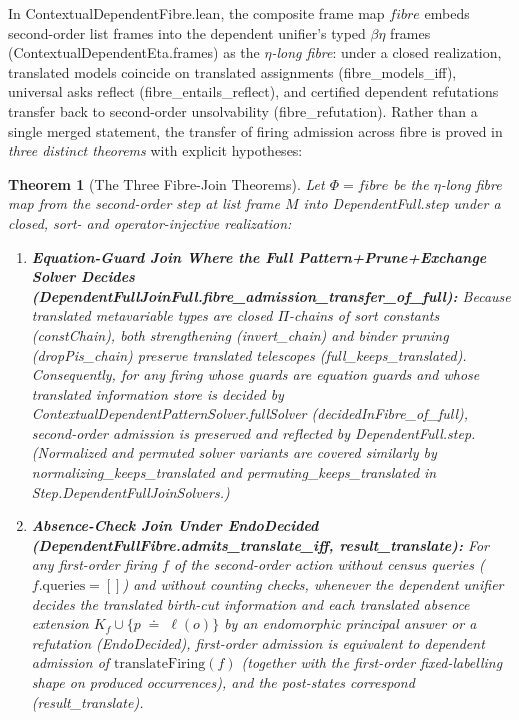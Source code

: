 \documentclass[11pt,a4paper]{article}
\newtheorem{theorem}{Theorem}[section]
\theoremstyle{definition}
\DeclareRobustCommand{\lean}[1]{%
  \ifmmode\text{\normalfont\ttfamily\footnotesize\detokenize{#1}}%
  \else{\normalfont\footnotesize\leanurl{#1}}\fi}
\def\lean#1{#1}%
\newcommand{\doteqStore}{\;\doteq\;}
\begin{document}
In \lean{ContextualDependentFibre.lean}, the composite frame map $\lean{fibre}$ embeds second-order list frames into the dependent unifier's typed $\beta\eta$ frames (\lean{ContextualDependentEta.frames}) as the \emph{$\eta$-long fibre}: under a closed realization, translated models coincide on translated assignments (\lean{fibre_models_iff}), universal asks reflect (\lean{fibre_entails_reflect}), and certified dependent refutations transfer back to second-order unsolvability (\lean{fibre_refutation}). Rather than a single merged statement, the transfer of firing admission across \lean{fibre} is proved in \emph{three distinct theorems} with explicit hypotheses:

\begin{theorem}[The Three Fibre-Join Theorems]
\label{thm:three-joins}
Let $\Phi = \lean{fibre}$ be the $\eta$-long fibre map from the second-order step at list frame $M$ into \lean{DependentFull.step} under a closed, sort- and operator-injective realization:
\begin{enumerate}[leftmargin=2em, nosep]
  \item \textbf{Equation-Guard Join Where the Full Pattern+Prune+Exchange Solver Decides (\lean{DependentFullJoinFull.fibre_admission_transfer_of_full}):}
  Because translated metavariable types are closed $\Pi$-chains of sort constants (\lean{constChain}), both strengthening (\lean{invert_chain}) and binder pruning (\lean{dropPis_chain}) preserve translated telescopes (\lean{full_keeps_translated}). Consequently, for any firing whose guards are equation guards and whose translated information store is decided by \lean{ContextualDependentPatternSolver.fullSolver} (\lean{decidedInFibre_of_full}), second-order admission is preserved and reflected by \lean{DependentFull.step}. (Normalized and permuted solver variants are covered similarly by \lean{normalizing_keeps_translated} and \lean{permuting_keeps_translated} in \lean{Step.DependentFullJoinSolvers}.)

  \item \textbf{Absence-Check Join Under \lean{EndoDecided} (\lean{DependentFullFibre.admits_translate_iff}, \lean{result_translate}):}
  For any first-order firing $f$ of the second-order action without census queries ($f.\mathrm{queries} = []$) and without counting checks, whenever the dependent unifier decides the translated birth-cut information \emph{and} each translated absence extension $K_f \cup \{p \doteqStore \ell(o)\}$ by an endomorphic principal answer or a refutation (\lean{EndoDecided}), first-order admission is equivalent to dependent admission of $\mathrm{translateFiring}(f)$ (together with the first-order fixed-labelling shape on produced occurrences), and the post-states correspond (\lean{result_translate}).


\end{enumerate}
\end{theorem}
\end{document}
